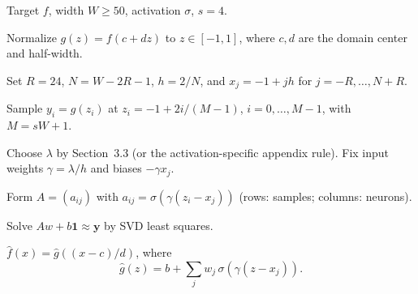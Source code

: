 \begin{algorithm}[t]
\caption{Practical QuILL construction}
\begin{algorithmic}
\Require Target $f$, width $W\ge50$, activation $\sigma$, $s=4$.

\State Normalize $g(z)=f(c+dz)$ to $z\in[-1,1]$,
where $c,d$ are the domain center and half-width.

\State Set $R=24$, $N=W-2R-1$, $h=2/N$, and
$x_j=-1+jh$ for $j=-R,\ldots,N+R$.

\State Sample $y_i=g(z_i)$ at $z_i=-1+2i/(M-1)$,
$i=0,\ldots,M-1$, with $M=sW+1$.

\State Choose $\lambda$ by Section~3.3
(or the activation-specific appendix rule).
Fix input weights $\gamma=\lambda/h$ and biases $-\gamma x_j$.

\State Form $A=(a_{ij})$ with
$a_{ij}=\sigma(\gamma(z_i-x_j))$
(rows: samples; columns: neurons).

\State Solve $Aw+b\mathbf1\approx\mathbf y$ by SVD least squares.

\State \Return $\widehat f(x)=\widehat g((x-c)/d)$, where
\[
\widehat g(z)=b+\sum_j w_j\,\sigma(\gamma(z-x_j)).
\]
\end{algorithmic}
\end{algorithm}
